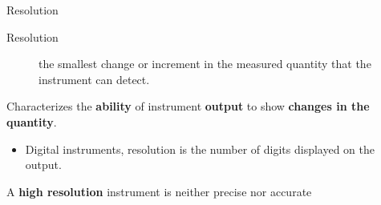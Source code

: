 \documentclass[12pt]{beamer}
\begin{document}
%

%
%

\begin{frame}{Resolution}


\begin{description}
\item [\alert{Resolution}] the smallest change or increment in the measured quantity
that the instrument can detect. 
\end{description}


Characterizes the \textbf{ability} of instrument 
\textbf{output} to show \textbf{changes in the quantity}.  

\begin{itemize}
\item Digital instruments, resolution is the number of digits displayed on the output.
\end{itemize}
A {\bf high resolution} instrument is \alert{neither precise nor accurate}
\end{frame}
\end{document}
